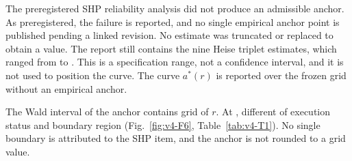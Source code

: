 The preregistered SHP reliability analysis did not produce an admissible anchor. %
As preregistered, the failure is reported, and no single empirical anchor point is published pending a linked revision. No estimate was truncated or replaced to obtain a value. %
The report still contains the nine Heise triplet estimates, which ranged from  to . This is a specification range, not a confidence interval, and it is not used to position the curve. %
The curve $a^*(r)$ is reported over the frozen grid without an empirical anchor. %


The Wald interval of the anchor contains  grid  of $r$. At ,   different  of execution status and boundary region (Fig.~\ref{fig:v4-F6}, Table~\ref{tab:v4-T1}). %
No single boundary is attributed to the SHP item, and the anchor is not rounded to a grid value. %


